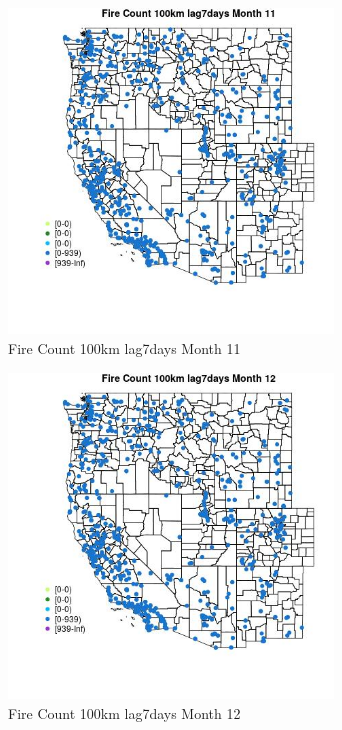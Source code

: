 \begin{figure} 
\centering  
\includegraphics[width=0.77\textwidth]{Code_Outputs/Report_ML_input_PM25_Step4_part_e_de_duplicated_aves_compiled_2019-05-21wNAs_MapObsMo11Fire_Count_100km_lag7days.jpg} 
\caption{\label{fig:Report_ML_input_PM25_Step4_part_e_de_duplicated_aves_compiled_2019-05-21wNAsMapObsMo11Fire_Count_100km_lag7days}Fire Count 100km lag7days Month 11} 
\end{figure} 
 

\begin{figure} 
\centering  
\includegraphics[width=0.77\textwidth]{Code_Outputs/Report_ML_input_PM25_Step4_part_e_de_duplicated_aves_compiled_2019-05-21wNAs_MapObsMo12Fire_Count_100km_lag7days.jpg} 
\caption{\label{fig:Report_ML_input_PM25_Step4_part_e_de_duplicated_aves_compiled_2019-05-21wNAsMapObsMo12Fire_Count_100km_lag7days}Fire Count 100km lag7days Month 12} 
\end{figure} 
 

